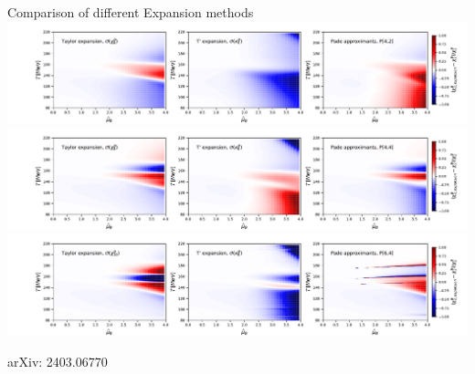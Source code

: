 \begin{frame}[fragile]{Comparison of different Expansion methods}
    \centering
    \includegraphics[width=0.87\linewidth,trim={0 0.7cm 0 0.6cm}, clip]{Images/Figures/diffchi2_3A.pdf}\\
    \includegraphics[width=0.87\linewidth,trim={0 0.7cm 0 0.6cm}, clip]{Images/Figures/diffchi2_3.pdf}\\
    \includegraphics[width=0.87\linewidth,trim={0 0 0 0.6cm}, clip]{Images/Figures/diffchi2_3B.pdf}\\
    {\centering \scriptsize arXiv: 2403.06770 \par}
\end{frame}